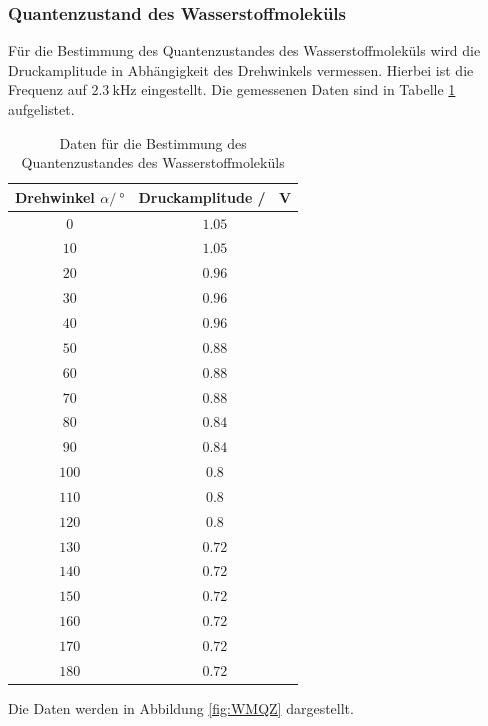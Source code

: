 \subsubsection{Quantenzustand des Wasserstoffmoleküls}
Für die Bestimmung des Quantenzustandes des Wasserstoffmoleküls wird die Druckamplitude in Abhängigkeit des Drehwinkels 
vermessen. Hierbei ist die Frequenz auf $\SI{2.3}{\kilo\hertz}$ eingestellt.
Die gemessenen Daten sind in Tabelle \ref{tab:WMQZ} aufgelistet.
\FloatBarrier
\begin{table}
    \centering
    \caption{Daten für die Bestimmung des Quantenzustandes des Wasserstoffmoleküls}
    \label{tab:WMQZ}
    \begin{tabular}{c c}
        \toprule
        Drehwinkel $\alpha / \SI{}{\degree}$ & Druckamplitude / \SI{}{\volt}\\
        \midrule
        $\num{0}$  &$\num{1.05}$\\
        $\num{10}$ &$\num{1.05}$\\
        $\num{20}$ &$\num{0.96}$\\
        $\num{30}$ &$\num{0.96}$\\
        $\num{40}$ &$\num{0.96}$\\
        $\num{50}$ &$\num{0.88}$\\
        $\num{60}$ &$\num{0.88}$\\
        $\num{70}$ &$\num{0.88}$\\
        $\num{80}$ &$\num{0.84}$\\
        $\num{90}$ &$\num{0.84}$\\
        $\num{100}$&$\num{0.8}$\\
        $\num{110}$&$\num{0.8}$\\
        $\num{120}$&$\num{0.8}$\\
        $\num{130}$&$\num{0.72}$\\
        $\num{140}$&$\num{0.72}$\\
        $\num{150}$&$\num{0.72}$\\
        $\num{160}$&$\num{0.72}$\\
        $\num{170}$&$\num{0.72}$\\
        $\num{180}$&$\num{0.72}$\\
        \bottomrule
    \end{tabular}
\end{table}
\FloatBarrier
Die Daten werden in Abbildung \ref{fig:WMQZ} dargestellt.
\FloatBarrier
